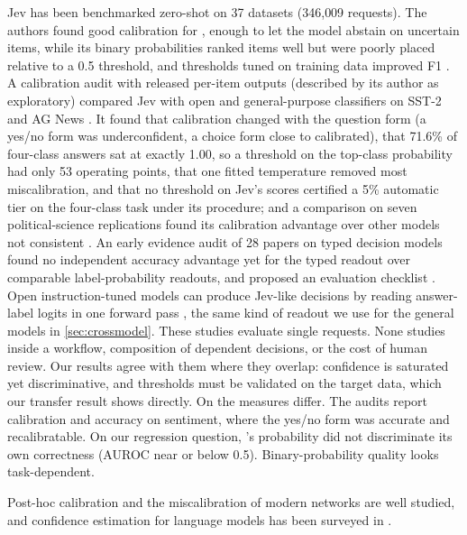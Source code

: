  Jev has been
benchmarked zero-shot on 37 datasets (346{,}009 requests). The
authors found good calibration for \choice{}, enough to let the model
abstain on uncertain items, while its binary probabilities ranked items
well but were poorly placed relative to a 0.5 threshold, and thresholds
tuned on training data improved F1 \citep{deusser2026jev}. A calibration audit with released per-item
outputs (described by its author as exploratory) compared Jev with open
and general-purpose classifiers on SST-2 and AG News
\citep{meng2026jevaudit}. It found that calibration changed with the
question form (a yes/no form was underconfident, a choice form close to
calibrated), that 71.6\% of four-class answers sat at exactly 1.00, so
a threshold on the top-class probability had only 53 operating points,
that one fitted temperature removed most miscalibration, and that no
threshold on Jev's scores certified a 5\% automatic tier on the
four-class task under its procedure; and a comparison on seven
political-science replications found its calibration advantage over
other models not consistent \citep{denney2026jev}. An early evidence
audit of 28 papers on typed decision models found no independent
accuracy advantage yet for the typed readout over comparable
label-probability readouts, and proposed an evaluation checklist
\citep{tang2026typed}. Open instruction-tuned models can produce
Jev-like decisions by reading answer-label logits in one forward pass
\citep{geuter2026innerjev}, the same kind of readout we use for the
general models in \cref{sec:crossmodel}. These studies evaluate single
requests. None studies \score{} inside a workflow, composition of
dependent decisions, or the cost of human review. Our results agree with
them where they overlap: \choice{} confidence is saturated yet
discriminative, and thresholds must be validated on the target data,
which our transfer result shows directly. On \noul{} the measures
differ. The audits report calibration and accuracy on sentiment, where
the yes/no form was accurate and recalibratable. On our regression
question, \noul{}'s probability did not discriminate its own correctness
(AUROC near or below 0.5). Binary-probability quality looks
task-dependent.

 Post-hoc calibration
\citep{platt1999probabilistic,naeini2015bbq} and the miscalibration of
modern networks \citep{guo2017calibration} are well studied, and
confidence estimation for language models has been surveyed in
\citep{geng2024survey}.

